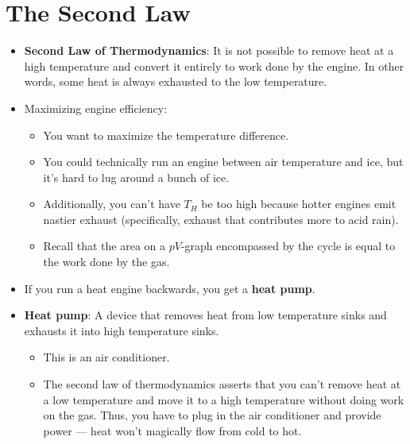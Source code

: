 \documentclass[../notes.tex]{subfiles}
\begin{document}
\section{The Second Law}
\begin{itemize}
    \item \textbf{Second Law of Thermodynamics}: It is not possible to remove heat at a high temperature and convert it entirely to work done by the engine. In other words, some heat is always exhausted to the low temperature.
    \item Maximizing engine efficiency:
    \begin{itemize}
        \item You want to maximize the temperature difference.
        \item You could technically run an engine between air temperature and ice, but it's hard to lug around a bunch of ice.
        \item Additionally, you can't have $T_H$ be too high because hotter engines emit nastier exhaust (specifically, exhaust that contributes more to acid rain).
        \item Recall that the area on a $pV$-graph encompassed by the cycle is equal to the work done by the gas.
    \end{itemize}
    \item If you run a heat engine backwards, you get a \textbf{heat pump}.
    \item \textbf{Heat pump}: A device that removes heat from low temperature sinks and exhausts it into high temperature sinks.
    \begin{itemize}
        \item This is an air conditioner.
        \item The second law of thermodynamics asserts that you can't remove heat at a low temperature and move it to a high temperature without doing work on the gas. Thus, you have to plug in the air conditioner and provide power --- heat won't magically flow from cold to hot.
    \end{itemize}
\end{itemize}
\end{document}
